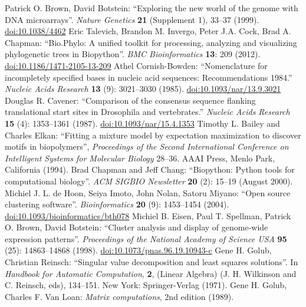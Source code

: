 \documentclass{report}
\begin{document}
\begin{thebibliography}{99}
Patrick O. Brown, David Botstein: ``Exploring the new world of the genome with DNA microarrays''. \textit{Nature Genetics} {\bf 21} (Supplement 1), 33--37 (1999). \href{http://dx.doi.org/10.1038/4462}{doi:10.1038/4462}
Eric Talevich, Brandon M. Invergo, Peter J.A. Cock, Brad A. Chapman: ``Bio.Phylo: A unified toolkit for processing, analyzing and visualizing phylogenetic trees in Biopython''.  \textit{BMC Bioinformatics} {\bf 13}: 209 (2012).  \href{http://dx.doi.org/10.1186/1471-2105-13-209}{doi:10.1186/1471-2105-13-209}
Athel Cornish-Bowden: ``Nomenclature for incompletely specified bases in nucleic acid sequences: Recommendations 1984.'' \textit{Nucleic Acids Research} {\bf 13} (9): 3021--3030 (1985). \href{http://dx.doi.org/10.1093/nar/13.9.3021}{doi:10.1093/nar/13.9.3021}
Douglas R. Cavener: ``Comparison of the consensus sequence flanking translational start sites in Drosophila and vertebrates.'' \textit{Nucleic Acids Research} {\bf 15} (4): 1353--1361 (1987). \href{http://dx.doi.org/10.1093/nar/15.4.1353}{doi:10.1093/nar/15.4.1353}
Timothy L. Bailey and Charles Elkan: ``Fitting a mixture model by expectation maximization to discover motifs in biopolymers'', \textit{Proceedings of the Second International Conference on Intelligent Systems for Molecular Biology} 28--36. AAAI Press, Menlo Park, California (1994).
Brad Chapman and Jeff Chang: ``Biopython: Python tools for computational biology''. \textit{ACM SIGBIO Newsletter} {\bf 20} (2): 15--19 (August 2000).
Michiel J. L. de Hoon, Seiya Imoto, John Nolan, Satoru Miyano: ``Open source clustering software''. \textit{Bioinformatics} {\bf 20} (9): 1453--1454 (2004). \href{http://dx.doi.org/10.1093/bioinformatics/bth078}{doi:10.1093/bioinformatics/bth078}
Michiel B. Eisen, Paul T. Spellman, Patrick O. Brown, David Botstein: ``Cluster analysis and display of genome-wide expression patterns''. \textit{Proceedings of the National Academy of Science USA} {\bf 95} (25): 14863--14868 (1998). \href{http://dx.doi.org/10.1073/pnas.96.19.10943-c}{doi:10.1073/pnas.96.19.10943-c}
Gene H. Golub, Christian Reinsch: ``Singular value decomposition and least squares solutions''. In \textit{Handbook for Automatic Computation}, {\bf 2}, (Linear Algebra) (J. H. Wilkinson and C. Reinsch, eds), 134--151. New York: Springer-Verlag (1971).
Gene H. Golub, Charles F. Van Loan: \textit{Matrix computations}, 2nd edition (1989).

\end{thebibliography}
\end{document}
